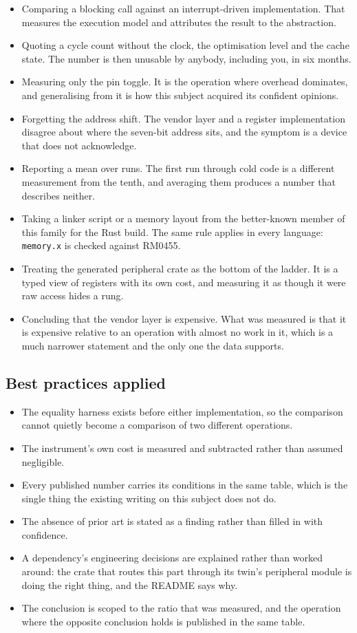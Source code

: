 \begin{itemize}
\item Comparing a blocking call against an interrupt-driven implementation. That
measures the execution model and attributes the result to the abstraction.
\item Quoting a cycle count without the clock, the optimisation level and the
cache state. The number is then unusable by anybody, including you, in six
months.
\item Measuring only the pin toggle. It is the operation where overhead
dominates, and generalising from it is how this subject acquired its confident
opinions.
\item Forgetting the address shift. The vendor layer and a register
implementation disagree about where the seven-bit address sits, and the symptom
is a device that does not acknowledge.
\item Reporting a mean over runs. The first run through cold code is a different
measurement from the tenth, and averaging them produces a number that describes
neither.
\item Taking a linker script or a memory layout from the better-known member of
this family for the Rust build. The same rule applies in every language:
\texttt{memory.x} is checked against RM0455.
\item Treating the generated peripheral crate as the bottom of the ladder. It is
a typed view of registers with its own cost, and measuring it as though it were
raw access hides a rung.
\item Concluding that the vendor layer is expensive. What was measured is that
it is expensive relative to an operation with almost no work in it, which is a
much narrower statement and the only one the data supports.
\end{itemize}

\subsection*{Best practices applied}

\begin{itemize}
\item The equality harness exists before either implementation, so the
comparison cannot quietly become a comparison of two different operations.
\item The instrument's own cost is measured and subtracted rather than assumed
negligible.
\item Every published number carries its conditions in the same table, which is
the single thing the existing writing on this subject does not do.
\item The absence of prior art is stated as a finding rather than filled in with
confidence.
\item A dependency's engineering decisions are explained rather than worked
around: the crate that routes this part through its twin's peripheral module is
doing the right thing, and the README says why.
\item The conclusion is scoped to the ratio that was measured, and the operation
where the opposite conclusion holds is published in the same table.
\end{itemize}

